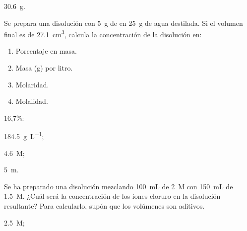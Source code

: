 \documentclass[10pt,a5paper,twoside]{article}
\begin{document}
  \begin{solution}
    \SI{30.6}{\gram}.
  \end{solution}




  \begin{exercise}[
      tags    = {termodinámica, entalpía, entalpia de reacción, calor},
      topics  = {química, termoquímica, termodinámica},
      source  = {FQ 1B OXF 2015, p78, e11},
    ]
    Se prepara una disolución con \SI{5}{\gram} de  en \SI{25}{\gram} de agua destilada. Si el volumen final es de \SI{27.1}{\cubic\centi\meter}, calcula la concentración de la disolución en:
    \begin{enumerate}
      \item Porcentaje en masa.
      \item Masa (\si{\gram}) por litro.
      \item Molaridad.
      \item Molalidad.
    \end{enumerate}
  \end{exercise}

  \begin{solution}
    \begin{enumerate*}
      \item 16,7\%:
      \item \SI{184.5}{\gram\per\liter};
      \item \SI{4.6}{M};
      \item \SI{5}{m}.
    \end{enumerate*}
  \end{solution}



  \begin{exercise}[
      tags    = {termodinámica, entalpía, entalpia de reacción, calor},
      topics  = {química, termoquímica, termodinámica},
      source  = {FQ 1B SAN 2015, p94, e63},
    ]
    Se ha preparado una disolución mezclando \SI{100}{\milli\liter} de  \SI{2}{M} con \SI{150}{\milli\liter} de  \SI{1.5}{M}.
    ¿Cuál será la concentración de los iones cloruro en la disolución resultante? Para calcularlo, supón que los volúmenes son aditivos.
  \end{exercise}

  \begin{solution}
      \SI{2.5}{M};
  \end{solution}

  
\end{document}
